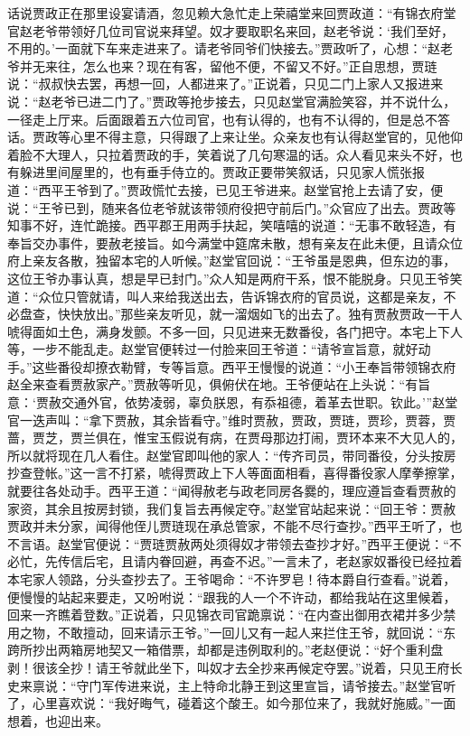 


\begin{parag}
    话说贾政正在那里设宴请酒，忽见赖大急忙走上荣禧堂来回贾政道：“有锦衣府堂官赵老爷带领好几位司官说来拜望。奴才要取职名来回，赵老爷说：‘我们至好，不用的。’一面就下车来走进来了。请老爷同爷们快接去。”贾政听了，心想：“赵老爷并无来往，怎么也来？现在有客，留他不便，不留又不好。”正自思想，贾琏说：“叔叔快去罢，再想一回，人都进来了。”正说着，只见二门上家人又报进来说：“赵老爷已进二门了。”贾政等抢步接去，只见赵堂官满脸笑容，并不说什么，一径走上厅来。后面跟着五六位司官，也有认得的，也有不认得的，但是总不答话。贾政等心里不得主意，只得跟了上来让坐。众亲友也有认得赵堂官的，见他仰着脸不大理人，只拉着贾政的手，笑着说了几句寒温的话。众人看见来头不好，也有躲进里间屋里的，也有垂手侍立的。贾政正要带笑叙话，只见家人慌张报道：“西平王爷到了。”贾政慌忙去接，已见王爷进来。赵堂官抢上去请了安，便说：“王爷已到，随来各位老爷就该带领府役把守前后门。”众官应了出去。贾政等知事不好，连忙跪接。西平郡王用两手扶起，笑嘻嘻的说道：“无事不敢轻造，有奉旨交办事件，要赦老接旨。如今满堂中筵席未散，想有亲友在此未便，且请众位府上亲友各散，独留本宅的人听候。”赵堂官回说：“王爷虽是恩典，但东边的事，这位王爷办事认真，想是早已封门。”众人知是两府干系，恨不能脱身。只见王爷笑道：“众位只管就请，叫人来给我送出去，告诉锦衣府的官员说，这都是亲友，不必盘查，快快放出。”那些亲友听见，就一溜烟如飞的出去了。独有贾赦贾政一干人唬得面如土色，满身发颤。不多一回，只见进来无数番役，各门把守。本宅上下人等，一步不能乱走。赵堂官便转过一付脸来回王爷道：“请爷宣旨意，就好动手。”这些番役却撩衣勒臂，专等旨意。西平王慢慢的说道：“小王奉旨带领锦衣府赵全来查看贾赦家产。”贾赦等听见，俱俯伏在地。王爷便站在上头说：“有旨意：‘贾赦交通外官，依势凌弱，辜负朕恩，有忝祖德，着革去世职。钦此。’”赵堂官一迭声叫：“拿下贾赦，其余皆看守。”维时贾赦，贾政，贾琏，贾珍，贾蓉，贾蔷，贾芝，贾兰俱在，惟宝玉假说有病，在贾母那边打闹，贾环本来不大见人的，所以就将现在几人看住。赵堂官即叫他的家人：“传齐司员，带同番役，分头按房抄查登帐。”这一言不打紧，唬得贾政上下人等面面相看，喜得番役家人摩拳擦掌，就要往各处动手。西平王道：“闻得赦老与政老同房各爨的，理应遵旨查看贾赦的家资，其余且按房封锁，我们复旨去再候定夺。”赵堂官站起来说：“回王爷：贾赦贾政并未分家，闻得他侄儿贾琏现在承总管家，不能不尽行查抄。”西平王听了，也不言语。赵堂官便说：“贾琏贾赦两处须得奴才带领去查抄才好。”西平王便说：“不必忙，先传信后宅，且请内眷回避，再查不迟。”一言未了，老赵家奴番役已经拉着本宅家人领路，分头查抄去了。王爷喝命：“不许罗皂！待本爵自行查看。”说着，便慢慢的站起来要走，又吩咐说：“跟我的人一个不许动，都给我站在这里候着，回来一齐瞧着登数。”正说着，只见锦衣司官跪禀说：“在内查出御用衣裙并多少禁用之物，不敢擅动，回来请示王爷。”一回儿又有一起人来拦住王爷，就回说：“东跨所抄出两箱房地契又一箱借票，却都是违例取利的。”老赵便说：“好个重利盘剥！很该全抄！请王爷就此坐下，叫奴才去全抄来再候定夺罢。”说着，只见王府长史来禀说：“守门军传进来说，主上特命北静王到这里宣旨，请爷接去。”赵堂官听了，心里喜欢说：“我好晦气，碰着这个酸王。如今那位来了，我就好施威。”一面想着，也迎出来。
\end{parag}


